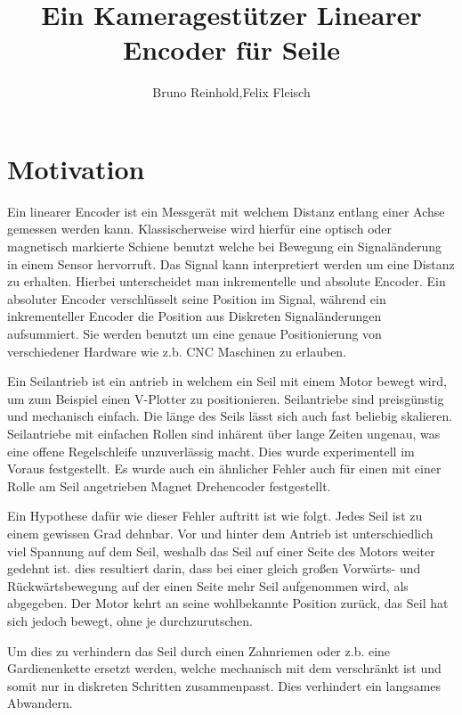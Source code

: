 \documentclass[10pt,a4paper]{scrreport}
\begin{document}
	
	\title{Ein Kameragestützer Linearer Encoder für Seile}
	\author{Bruno Reinhold,Felix Fleisch}
	\maketitle



\section{Motivation}
Ein linearer Encoder ist ein Messgerät mit welchem Distanz entlang einer Achse gemessen werden kann. Klassischerweise wird hierfür eine optisch oder magnetisch markierte Schiene benutzt welche bei Bewegung ein Signaländerung in einem Sensor hervorruft. Das Signal kann interpretiert werden um eine Distanz zu erhalten. Hierbei unterscheidet man inkrementelle und absolute Encoder. Ein absoluter Encoder verschlüsselt seine Position im Signal, während ein inkrementeller Encoder die Position aus Diskreten Signaländerungen aufsummiert. Sie werden benutzt um eine genaue Positionierung von verschiedener Hardware wie z.b. CNC Maschinen zu erlauben. 

Ein Seilantrieb ist ein antrieb in welchem ein Seil mit einem Motor bewegt wird, um zum Beispiel einen V-Plotter zu positionieren. Seilantriebe sind preisgünstig und mechanisch einfach. Die länge des Seils lässt sich auch fast beliebig skalieren. Seilantriebe mit einfachen Rollen sind inhärent über lange Zeiten ungenau, was eine offene Regelschleife unzuverlässig macht. Dies wurde experimentell im Voraus festgestellt. Es wurde auch ein ähnlicher Fehler auch für einen mit einer Rolle am Seil angetrieben Magnet Drehencoder festgestellt.

Ein Hypothese dafür wie dieser Fehler auftritt ist wie folgt. Jedes Seil ist zu einem gewissen Grad dehnbar. Vor und hinter dem Antrieb ist unterschiedlich viel Spannung auf dem Seil, weshalb 
das Seil auf einer Seite des Motors weiter gedehnt ist. dies resultiert darin, dass bei einer gleich großen Vorwärts- und Rückwärtsbewegung auf der einen Seite mehr Seil aufgenommen wird, als abgegeben. Der Motor kehrt an seine wohlbekannte Position zurück, das Seil hat sich jedoch bewegt, ohne je durchzurutschen.

Um dies zu verhindern das Seil durch einen Zahnriemen oder z.b. eine Gardienenkette ersetzt werden, welche mechanisch mit dem verschränkt ist und somit nur in diskreten Schritten zusammenpasst. Dies verhindert ein langsames Abwandern.
\end{document}
